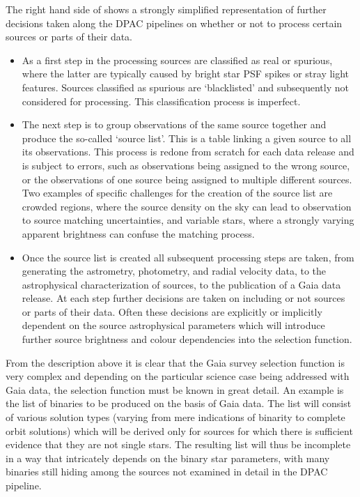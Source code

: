The right hand side of  shows a strongly simplified representation of further decisions taken along the DPAC pipelines on whether or not to process certain sources or parts of their data.
\begin{itemize}
    \item As a first step in the processing sources are classified as real or spurious, where the latter are typically caused by bright star PSF spikes or stray light features. Sources classified as spurious are `blacklisted' and subsequently not considered for processing. This classification process is imperfect.
    \item The next step is to group observations of the same source together and produce the so-called `source list'. This is a table linking a given source to all its observations. This process is redone from scratch for each data release and is subject to errors, such as observations being assigned to the wrong source, or the observations of one source being assigned to multiple different sources. Two examples of specific challenges for the creation of the source list are crowded regions, where the source density on the sky can lead to observation to source matching uncertainties, and variable stars, where a strongly varying apparent brightness can confuse the matching process.
    \item Once the source list is created all subsequent processing steps are taken, from generating the astrometry, photometry, and radial velocity data, to the astrophysical characterization of sources, to the publication of a Gaia data release. At each step further decisions are taken on including or not sources or parts of their data. Often these decisions are explicitly or implicitly dependent on the source astrophysical parameters which will introduce further source brightness and colour dependencies into the selection function.
\end{itemize}

From the description above it is clear that the Gaia survey selection function is very complex and depending on the particular science case being addressed with Gaia data, the selection function must be known in great detail. An example is the list of binaries to be produced on the basis of Gaia data. The list will consist of various solution types (varying from mere indications of binarity to complete orbit solutions) which will be derived only for sources for which there is sufficient evidence that they are not single stars. The resulting list will thus be incomplete in a way that intricately depends on the binary star parameters, with many binaries still hiding among the sources not examined in detail in the DPAC pipeline.

